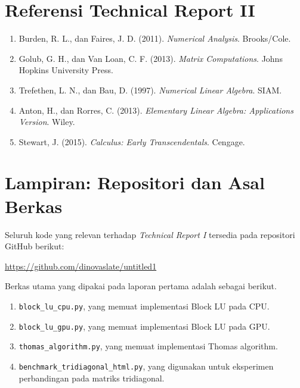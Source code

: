 \documentclass[12pt,a4paper]{article}
\begin{document}
\section*{Referensi Technical Report II}
\begin{enumerate}[leftmargin=1.25em]
  \item Burden, R. L., dan Faires, J. D. (2011). \emph{Numerical Analysis}. Brooks/Cole.
  \item Golub, G. H., dan Van Loan, C. F. (2013). \emph{Matrix Computations}. Johns Hopkins University Press.
  \item Trefethen, L. N., dan Bau, D. (1997). \emph{Numerical Linear Algebra}. SIAM.
  \item Anton, H., dan Rorres, C. (2013). \emph{Elementary Linear Algebra: Applications Version}. Wiley.
  \item Stewart, J. (2015). \emph{Calculus: Early Transcendentals}. Cengage.
\end{enumerate}

\section*{Lampiran: Repositori dan Asal Berkas}
Seluruh kode yang relevan terhadap \emph{Technical Report I} tersedia pada repositori GitHub berikut:
\begin{center}
\url{https://github.com/dinovaslate/untitled1}
\end{center}

Berkas utama yang dipakai pada laporan pertama adalah sebagai berikut.
\begin{enumerate}[leftmargin=1.5em]
  \item \texttt{block\_lu\_cpu.py}, yang memuat implementasi Block LU pada CPU.
  \item \texttt{block\_lu\_gpu.py}, yang memuat implementasi Block LU pada GPU.
  \item \texttt{thomas\_algorithm.py}, yang memuat implementasi Thomas algorithm.
  \item \texttt{benchmark\_tridiagonal\_html.py}, yang digunakan untuk eksperimen perbandingan pada matriks tridiagonal.
\end{enumerate}
\end{document}
